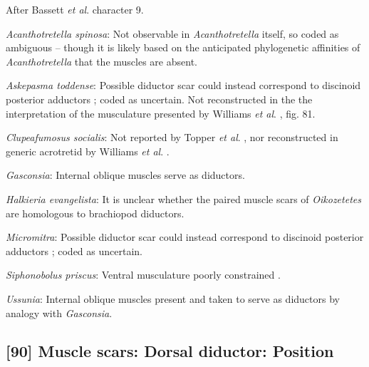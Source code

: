 \documentclass[openany]{book}
\begin{document}
After Bassett \emph{et al}.
\citeyearpar{Bassett2001Functionalmorphology} character 9.

\hypertarget{Acanthotretella_spinosa-coding-89}{}
\emph{Acanthotretella spinosa}: Not observable in \emph{Acanthotretella}
itself, so coded as ambiguous -- though it is likely based on the
anticipated phylogenetic affinities of \emph{Acanthotretella} that the
muscles are absent.

\hypertarget{Askepasma_toddense-coding-89}{}
\emph{Askepasma toddense}: Possible diductor scar could instead
correspond to discinoid posterior adductors
\citep{Williams1998Thediversity}; coded as uncertain. Not reconstructed
in the the interpretation of the musculature presented by Williams
\emph{et al}. \citeyearpar{Williams2000LinguliformeaCraniiformea}, fig.
81.

\hypertarget{Clupeafumosus_socialis-coding-89}{}
\emph{Clupeafumosus socialis}: Not reported by Topper \emph{et al}.
\citeyearpar{Topper2013Reappraisalof}, nor reconstructed in generic
acrotretid by Williams \emph{et al}.
\citeyearpar{Williams2000LinguliformeaCraniiformea}.

\hypertarget{Gasconsia-coding-89}{}
\emph{Gasconsia}: Internal oblique muscles serve as diductors.

\hypertarget{Halkieria_evangelista-coding-89}{}
\emph{Halkieria evangelista}: It is unclear whether the paired muscle
scars of \emph{Oikozetetes} are homologous to brachiopod diductors.

\hypertarget{Micromitra-coding-89}{}
\emph{Micromitra}: Possible diductor scar could instead correspond to
discinoid posterior adductors \citep{Williams1998Thediversity}; coded as
uncertain.

\hypertarget{Siphonobolus_priscus-coding-89}{}
\emph{Siphonobolus priscus}: Ventral musculature poorly constrained
\citep{Williams2000LinguliformeaCraniiformea, Popov2009Earlyontogeny}.

\hypertarget{Ussunia-coding-89}{}
\emph{Ussunia}: Internal oblique muscles present \citep{Nikitin1984} and
taken to serve as diductors by analogy with \emph{Gasconsia}.

\subsection*{{[}90{]} Muscle scars: Dorsal diductor:
Position}\label{muscle-scars-dorsal-diductor-position}
\end{document}
